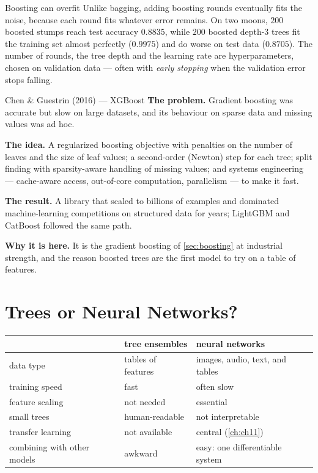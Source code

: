 \begin{pitfall}{Boosting can overfit}
Unlike bagging, adding boosting rounds eventually fits the noise, because each
round fits whatever error remains. On two moons, $200$ boosted stumps reach test
accuracy $0.8835$, while $200$ boosted depth-$3$ trees fit the training set
almost perfectly ($0.9975$) and do worse on test data ($0.8705$). The number of
rounds, the tree depth and the learning rate are hyperparameters, chosen on
validation data --- often with \emph{early stopping} when the validation error
stops falling.
\end{pitfall}

\begin{researchspotlight}{Chen \& Guestrin (2016) --- XGBoost}
\textbf{The problem.} Gradient boosting was accurate but slow on large datasets,
and its behaviour on sparse data and missing values was ad hoc.

\textbf{The idea.} A regularized boosting objective with penalties on the number
of leaves and the size of leaf values; a second-order (Newton) step for each
tree; split finding with sparsity-aware handling of missing values; and systems
engineering --- cache-aware access, out-of-core computation, parallelism --- to
make it fast.

\textbf{The result.} A library that scaled to billions of examples and dominated
machine-learning competitions on structured data for years; LightGBM and
CatBoost followed the same path.

\textbf{Why it is here.} It is the gradient boosting of \cref{sec:boosting} at
industrial strength, and the reason boosted trees are the first model to try on
a table of features.
\parencite{chen2016}
\end{researchspotlight}

\section{Trees or Neural Networks?}
\label{sec:trees-vs-nn}

\begin{center}
\small
\renewcommand{\arraystretch}{1.3}
\begin{tabular}{@{}L{3.2cm}L{3.9cm}L{3.9cm}@{}}
\toprule
 & tree ensembles & neural networks\\
\midrule
data type & tables of features & images, audio, text, and tables\\
training speed & fast & often slow\\
feature scaling & not needed & essential\\
small trees & human-readable & not interpretable\\
transfer learning & not available & central (\cref{ch:ch11})\\
combining with other models & awkward & easy: one differentiable system\\
\bottomrule
\end{tabular}
\end{center}

